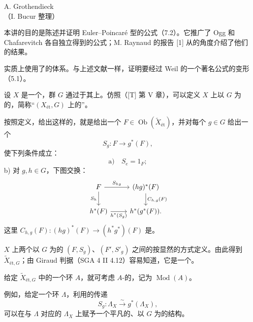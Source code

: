 \begin{center}A. Grothendieck\\（I. Bucur 整理）\end{center}
本讲的目的是陈述并证明 Euler--Poincaré 型的公式（7.2）。它推广了 Ogg 和 Chafarevitch 各自独立得到的公式；M. Raynaud 的报告 [1] 从的角度介绍了他们的结果。

实质上使用了的体系。与上述文献一样，证明要经过 Weil 的一个著名公式的变形（5.1）。

设 $X$ 是一个，群 $G$ 通过于其上。仿照（[T] 第 V 章），可以定义 $X$ 上以 $G$ 为的，简称“$(X_{\mathrm{ét}},G)$ 上的”。

按照定义，给出这样的，就是给出一个 $F\in\operatorname{Ob}(\widetilde X_{\mathrm{ét}})$，并对每个 $g\in G$ 给出一个
\[
S_g:F\longrightarrow g^*(F),
\]
使下列条件成立：
\[
\text{a)}\quad S_e=1_F;
\]
\noindent b) 对 $g,h\in G$，下图交换：
\[
\begin{tikzcd}
F\arrow[r,"S_{hg}"]\arrow[d,"S_h"']&(hg)^*(F)\arrow[d,"{C_{h,g}(F)}"]\\
h^*(F)\arrow[r,"h^*(S_g)"']&h^*(g^*(F)).
\end{tikzcd}
\]
这里 $C_{h,g}(F):(hg)^*(F)\longrightarrow(h^*g^*)(F)$ 是。

$X$ 上两个以 $G$ 为的 $(F,S_g)$、$(F',S'_g)$ 之间的按显然的方式定义。由此得到 $\widetilde X_{\mathrm{ét},G}$；由 Giraud 判据（SGA 4 II 4.12）容易知道，它是一个。

给定 $\widetilde X_{\mathrm{ét},G}$ 中的一个环 $A$，就可考虑 $A$-的，记为 $\operatorname{Mod}(A)$。

例如，给定一个环 $\Lambda$，利用的传递
\[
S_g:\Lambda_X\xrightarrow{\sim}g^*(\Lambda_X),
\]
可以在与 $\Lambda$ 对应的 $\Lambda_X$ 上赋予一个平凡的、以 $G$ 为的结构。

